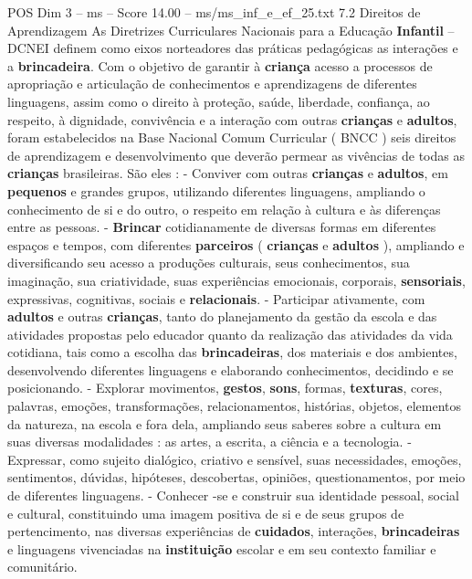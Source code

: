 \begin{textsample}{POS Dim 3 – ms – Score 14.00 – ms/ms\_inf\_e\_ef\_25.txt}  \label{ex:f3_pos_197}
7.2 Direitos de Aprendizagem As Diretrizes Curriculares Nacionais para a Educação \textbf{Infantil} – DCNEI definem como eixos norteadores das práticas pedagógicas as interações e a \textbf{brincadeira}.
Com o objetivo de garantir à \textbf{criança} acesso a processos de apropriação e articulação de conhecimentos e aprendizagens de diferentes linguagens, assim como o direito à proteção, saúde, liberdade, confiança, ao respeito, à dignidade, convivência e a interação com outras \textbf{crianças} e \textbf{adultos}, foram estabelecidos na Base Nacional Comum Curricular ( BNCC ) seis direitos de aprendizagem e desenvolvimento que deverão permear as vivências de todas as \textbf{crianças} brasileiras.
São eles : - Conviver com outras \textbf{crianças} e \textbf{adultos}, em \textbf{pequenos} e grandes grupos, utilizando diferentes linguagens, ampliando o conhecimento de si e do outro, o respeito em relação à cultura e às diferenças entre as pessoas. - \textbf{Brincar} cotidianamente de diversas formas em diferentes espaços e tempos, com diferentes \textbf{parceiros} ( \textbf{crianças} e \textbf{adultos} ), ampliando e diversificando seu acesso a produções culturais, seus conhecimentos, sua imaginação, sua criatividade, suas experiências emocionais, corporais, \textbf{sensoriais}, expressivas, cognitivas, sociais e \textbf{relacionais}. - Participar ativamente, com \textbf{adultos} e outras \textbf{crianças}, tanto do planejamento da gestão da escola e das atividades propostas pelo educador quanto da realização das atividades da vida cotidiana, tais como a escolha das \textbf{brincadeiras}, dos materiais e dos ambientes, desenvolvendo diferentes linguagens e elaborando conhecimentos, decidindo e se posicionando. - Explorar movimentos, \textbf{gestos}, \textbf{sons}, formas, \textbf{texturas}, cores, palavras, emoções, transformações, relacionamentos, histórias, objetos, elementos da natureza, na escola e fora dela, ampliando seus saberes sobre a cultura em suas diversas modalidades : as artes, a escrita, a ciência e a tecnologia. - Expressar, como sujeito dialógico, criativo e sensível, suas necessidades, emoções, sentimentos, dúvidas, hipóteses, descobertas, opiniões, questionamentos, por meio de diferentes linguagens. - Conhecer -se e construir sua identidade pessoal, social e cultural, constituindo uma imagem positiva de si e de seus grupos de pertencimento, nas diversas experiências de \textbf{cuidados}, interações, \textbf{brincadeiras} e linguagens vivenciadas na \textbf{instituição} escolar e em seu contexto familiar e comunitário.

\end{textsample}
